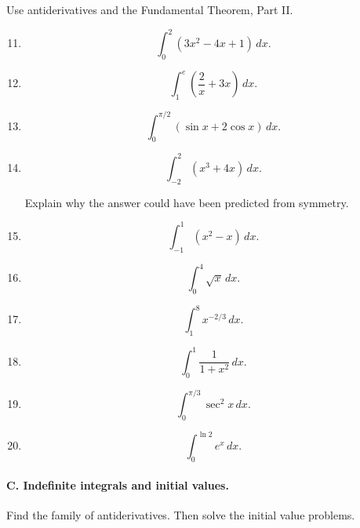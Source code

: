 Use antiderivatives and the Fundamental Theorem, Part II.

\begin{enumerate}
\setcounter{enumi}{10}

\item

\[
\int_0^2 (3x^2-4x+1)\,dx.
\]

\item

\[
\int_1^e \left(\frac2x+3x\right)\,dx.
\]

\item

\[
\int_0^{\pi/2}(\sin x+2\cos x)\,dx.
\]

\item

\[
\int_{-2}^2 (x^3+4x)\,dx.
\]

Explain why the answer could have been predicted from symmetry.

\item

\[
\int_{-1}^1 (x^2-x)\,dx.
\]

\item

\[
\int_0^4 \sqrt{x}\,dx.
\]

\item

\[
\int_1^8 x^{-2/3}\,dx.
\]

\item

\[
\int_0^1 \frac{1}{1+x^2}\,dx.
\]

\item

\[
\int_0^{\pi/3}\sec^2 x\,dx.
\]

\item

\[
\int_0^{\ln 2} e^x\,dx.
\]

\end{enumerate}

\paragraph{C. Indefinite integrals and initial values.}

Find the family of antiderivatives.  Then solve the initial value problems.

